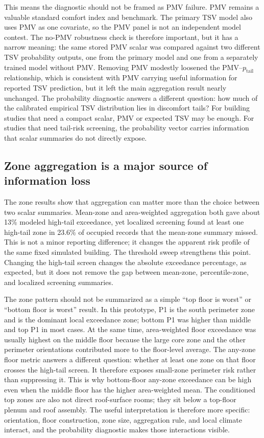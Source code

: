 This means the diagnostic should not be framed as PMV failure. PMV remains a valuable standard comfort index and benchmark. The primary TSV model also uses PMV as one covariate, so the PMV panel is not an independent model contest. The no-PMV robustness check is therefore important, but it has a narrow meaning: the same stored PMV scalar was compared against two different TSV probability outputs, one from the primary model and one from a separately trained model without PMV. Removing PMV modestly loosened the PMV--$p_{\mathrm{tail}}$ relationship, which is consistent with PMV carrying useful information for reported TSV prediction, but it left the main aggregation result nearly unchanged. The probability diagnostic answers a different question: how much of the calibrated empirical TSV distribution lies in discomfort tails? For building studies that need a compact scalar, PMV or expected TSV may be enough. For studies that need tail-risk screening, the probability vector carries information that scalar summaries do not directly expose.

\subsection{Zone aggregation is a major source of information loss}

The zone results show that aggregation can matter more than the choice between two scalar summaries. Mean-zone and area-weighted aggregation both gave about 13\% modeled high-tail exceedance, yet localized screening found at least one high-tail zone in 23.6\% of occupied records that the mean-zone summary missed. This is not a minor reporting difference; it changes the apparent risk profile of the same fixed simulated building. The threshold sweep strengthens this point. Changing the high-tail screen changes the absolute exceedance percentage, as expected, but it does not remove the gap between mean-zone, percentile-zone, and localized screening summaries.

The zone pattern should not be summarized as a simple ``top floor is worst'' or ``bottom floor is worst'' result. In this prototype, P1 is the south perimeter zone and is the dominant local exceedance zone; bottom P1 was higher than middle and top P1 in most cases. At the same time, area-weighted floor exceedance was usually highest on the middle floor because the large core zone and the other perimeter orientations contributed more to the floor-level average. The any-zone floor metric answers a different question: whether at least one zone on that floor crosses the high-tail screen. It therefore exposes small-zone perimeter risk rather than suppressing it. This is why bottom-floor any-zone exceedance can be high even when the middle floor has the higher area-weighted mean. The conditioned top zones are also not direct roof-surface rooms; they sit below a top-floor plenum and roof assembly. The useful interpretation is therefore more specific: orientation, floor construction, zone size, aggregation rule, and local climate interact, and the probability diagnostic makes those interactions visible.

